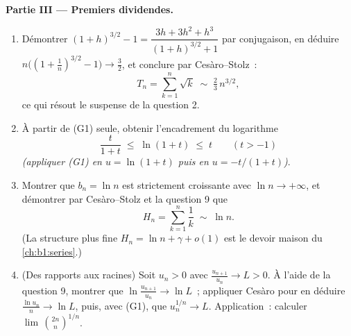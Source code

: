 \begin{problem}[{Devoir maison --- le \omterm{pb:b1:seq:1}{théorème de Cesàro--Stolz}
et l'asymptotique $u_n \sim \sqrt{3/n}$ pour $u_{n+1} = \sin
u_n$}]
\medskip
\noindent\textbf{Partie III --- Premiers dividendes.}
\begin{enumerate}[resume]
  \item Démontrer $(1+h)^{3/2} - 1 = \dfrac{3h + 3h^2 +
        h^3}{(1+h)^{3/2} + 1}$ par conjugaison, en déduire
        $n\bigl((1 + \tfrac1n)^{3/2} - 1\bigr) \to \tfrac32$,
        et conclure par Cesàro--Stolz~:
        \[
        T_n = \sum_{k=1}^{n} \sqrt k \;\sim\; \tfrac23\,
        n^{3/2} ,
        \]
        ce qui résout le suspense de la question 2.
  \item À partir de (G1) seule, obtenir l'encadrement du logarithme
        \[
        \frac{t}{1 + t} \;\leq\; \ln(1 + t) \;\leq\; t
        \qquad (t > -1)
        \]
        \emph{(appliquer (G1) en $u = \ln(1+t)$ puis en $u =
        -t/(1+t)$)}.
  \item Montrer que $b_n = \ln n$ est strictement croissante avec
        $\ln n \to +\infty$, et démontrer par Cesàro--Stolz et la
        question 9 que
        \[
        H_n = \sum_{k=1}^{n} \frac 1k \;\sim\; \ln n .
        \]
        (La structure plus fine $H_n = \ln n + \gamma + o(1)$ est le
        devoir maison du \cref{ch:b1:series}.)
  \item (Des rapports aux racines) Soit $u_n > 0 $ avec
        $\frac{u_{n+1}}{u_n} \to L > 0$. À l'aide de la question 9,
        montrer que $\ln\frac{u_{n+1}}{u_n} \to \ln L$~; appliquer
        Cesàro pour en déduire $\frac{\ln u_n}{n} \to \ln L$, puis,
        avec (G1), que $u_n^{1/n} \to L$. Application~: calculer
        $\lim\,\binom{2n}{n}^{1/n}$.
\end{enumerate}


\end{problem}

